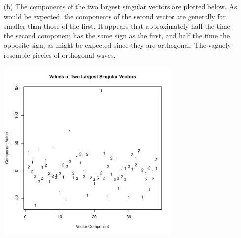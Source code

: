 \documentclass[11pt]{article}
\theoremstyle{definition}
\begin{document}
\begin{itemize}
\begin{itemize}
\begin{center}
                \end{center}
            \item[(b)]
                The components of the two largest singular vectors are plotted below. As would be expected, the components of the second vector are generally far smaller than those of the first. It appears that approximately half the time the second component has the same sign as the first, and half the time the opposite sign, as might be expected since they are orthogonal. The vaguely resemble piecies of orthogonal waves.  
                \begin{center}
                    \includegraphics[width=9cm]{hw8/5_b}
                \end{center}


\end{itemize}
\end{itemize}
\end{document}
